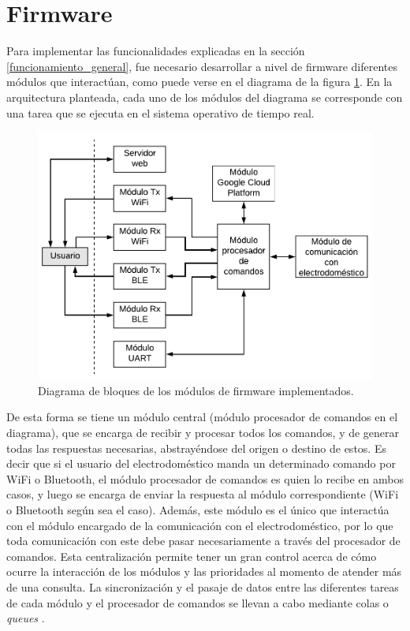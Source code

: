 \section{Firmware}

Para implementar las funcionalidades explicadas en la sección \ref{funcionamiento_general}, fue necesario desarrollar a nivel de firmware diferentes módulos que interactúan, como puede verse en el diagrama de la figura \ref{fig:fw_diagram}. En la arquitectura planteada, cada uno de los módulos del diagrama se corresponde con una tarea que se ejecuta en el sistema operativo de tiempo real. 

\begin{figure}[h]
\centering
\includegraphics[width=\textwidth]{./Figures/firmware_diagram.pdf}
\caption{Diagrama de bloques de los módulos de firmware implementados.}
\label{fig:fw_diagram}
\end{figure}

De esta forma se tiene un módulo central (módulo procesador de comandos en el diagrama), que se encarga de recibir y procesar todos los comandos, y de generar todas las respuestas necesarias, abstrayéndose del origen o destino de estos. Es decir que si el usuario del electrodoméstico manda un determinado comando por WiFi o Bluetooth, el módulo procesador de comandos es quien lo recibe en ambos casos, y luego se encarga de enviar la respuesta al módulo correspondiente (WiFi o Bluetooth según sea el caso). Además, este módulo es el único que interactúa con el módulo encargado de la comunicación con el electrodoméstico, por lo que toda comunicación con este debe pasar necesariamente a través del procesador de comandos. Esta centralización permite tener un gran control acerca de cómo ocurre la interacción de los módulos y las prioridades al momento de atender más de una consulta. La sincronización y el pasaje de datos entre las diferentes tareas de cada módulo y el procesador de comandos se llevan a cabo mediante colas o \emph{queues} \citep{freertos_queues}.

